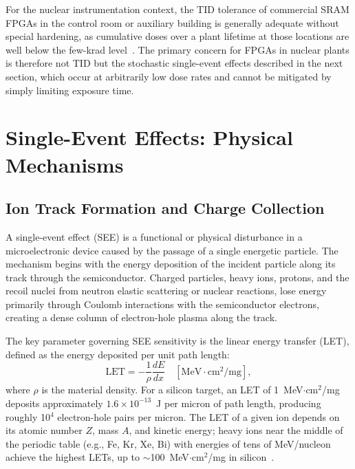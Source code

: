 For the nuclear instrumentation context, the TID tolerance of
commercial SRAM FPGAs in the control room or auxiliary building
is generally adequate without special hardening, as cumulative
doses over a plant lifetime at those locations are well below the
few-krad level~\cite{ANS_ICModernization_2025}.  The primary concern
for FPGAs in nuclear plants is therefore not TID but the stochastic
single-event effects described in the next section, which occur at
arbitrarily low dose rates and cannot be mitigated by simply
limiting exposure time.

\section{Single-Event Effects: Physical Mechanisms}
\label{sec:SEE_physics}

\subsection{Ion Track Formation and Charge Collection}

A single-event effect (SEE) is a functional or physical disturbance
in a microelectronic device caused by the passage of a single
energetic particle.  The mechanism begins with the energy deposition
of the incident particle along its track through the semiconductor.
Charged particles, heavy ions, protons, and the recoil nuclei from
neutron elastic scattering or nuclear reactions, lose energy
primarily through Coulomb interactions with the semiconductor
electrons, creating a dense column of electron-hole plasma along
the track.

The key parameter governing SEE sensitivity is the linear energy
transfer (LET), defined as the energy deposited per unit path length:
\begin{equation}
  \text{LET} = -\frac{1}{\rho}\frac{dE}{dx}
  \quad \left[\text{MeV}\cdot\text{cm}^2\text{/mg}\right],
  \label{eq:LET}
\end{equation}
where $\rho$ is the material density.  For a silicon target, an LET
of 1~MeV$\cdot$cm$^2$/mg deposits approximately $1.6 \times 10^{-13}$~J
per micron of path length, producing roughly 10$^4$ electron-hole
pairs per micron.  The LET of a given ion depends on its atomic number
$Z$, mass $A$, and kinetic energy; heavy ions near the middle of the
periodic table (e.g., Fe, Kr, Xe, Bi) with energies of tens of
MeV/nucleon achieve the highest LETs, up to
$\sim$100~MeV$\cdot$cm$^2$/mg in silicon~\cite{petersen2011single}.

